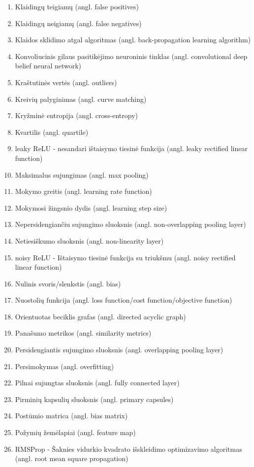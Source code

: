 \begin{enumerate}
	\item Klaidingų teigiamų (angl. false positives)
	\item Klaidingų neigiamų (angl. false negatives)
	\item Klaidos sklidimo atgal algoritmas (angl. back-propagation learning algorithm)
	\item Konvoliucinis gilaus pasitikėjimo neuroninis tinklas (angl. convolutional deep belief neural network)
	\item Kraštutinės vertės (angl. outliers)
	\item Kreivių palyginimas (angl. curve matching)
	\item Kryžminė entropija (angl. cross-entropy)
	\item Kvartilis (angl. quartile)
	\item leaky ReLU - nesandari ištaisymo tiesinė funkcija (angl. leaky rectified linear function)
	\item Maksimalus sujungimas (angl. max pooling)
	\item Mokymo greitis (angl. learning rate function)
	\item Mokymosi žingsnio dydis (angl. learning step size)
	\item Nepersidengiančiu sujungimo sluoksnis (angl. non-overlapping pooling layer)
	\item Netiesiškumo sluoksnis (angl. non-linearity layer)
	\item noisy ReLU - Ištaisymo tiesinė funkcija su triukšmu (angl. noisy rectified linear function)
	\item Nulinis svoris/slenkstis (angl. bias)
	\item Nuostolių funkcija (angl. loss function/cost function/objective function)
	\item Orientuotas beciklis grafas (angl. directed acyclic graph)
	\item Panašumo metrikos (angl. similarity metrics)
	\item Persidengiantis sujungimo sluoksnis (angl. overlapping pooling layer)
	\item Persimokymas (angl. overfitting)
	\item Pilnai sujungtas sluoksnis (angl. fully connected layer)
	\item Pirminių kapsulių sluoksnis (angl. primary capsules)
	\item Postūmio matrica (angl. bias matrix)
	\item Požymių žemėlapiai (angl. feature map)
	\item RMSProp - Šaknies vidurkio kvadrato išskleidimo optimizavimo algoritmas (angl. root mean square propagation)

\end{enumerate}
